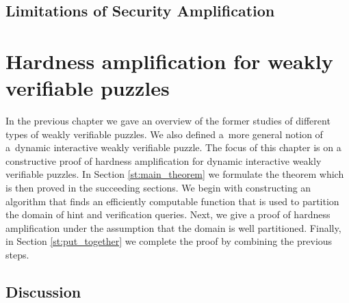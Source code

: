 \documentclass[11pt,a4paper,titlepage]{memoir}
\begin{document}
\section{Limitations of Security Amplification}
%
\chapter{Hardness amplification for weakly verifiable puzzles}
\label{ch:main_result}
In the previous chapter we gave an overview of the former studies of different types of weakly verifiable puzzles.
We also defined a~more general notion of a~dynamic interactive weakly verifiable puzzle.
The focus of this chapter is on a constructive proof of hardness amplification for dynamic interactive weakly verifiable puzzles.
In Section \ref{st:main_theorem} we formulate the theorem which is then proved in the succeeding sections.
We begin with constructing an algorithm that finds an efficiently computable function that is used
to partition the domain of hint and verification queries. Next, we give a proof of hardness amplification
under the assumption that the domain is well partitioned. Finally, in Section \ref{st:put_together}
we complete the proof by combining the previous steps.
%

%

%

%

%
\section{Discussion}
%
%
\appendix


\backmatter



\end{document}
